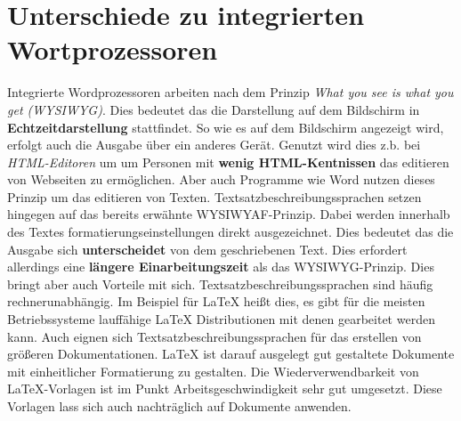 \section{Unterschiede zu integrierten Wortprozessoren}
Integrierte Wordprozessoren arbeiten nach dem Prinzip \textit{What you see is what you get (WYSIWYG)}. Dies bedeutet das die Darstellung auf dem Bildschirm in \textbf{Echtzeitdarstellung} stattfindet. So wie es auf dem Bildschirm angezeigt wird, erfolgt auch die Ausgabe über ein anderes Gerät. Genutzt wird dies z.b. bei \textit{HTML-Editoren} um um Personen mit \textbf{wenig HTML-Kentnissen} das editieren von Webseiten zu ermöglichen. Aber auch Programme wie Word nutzen dieses Prinzip um das editieren von Texten.
Textsatzbeschreibungssprachen setzen hingegen auf das bereits erwähnte WYSIWYAF-Prinzip. Dabei werden innerhalb des Textes formatierungseinstellungen direkt ausgezeichnet. Dies bedeutet das die Ausgabe sich \textbf{unterscheidet} von dem geschriebenen Text. Dies erfordert allerdings eine \textbf{längere Einarbeitungszeit} als das WYSIWYG-Prinzip.
Dies bringt aber auch Vorteile mit sich. Textsatzbeschreibungssprachen sind häufig rechnerunabhängig. Im Beispiel für LaTeX heißt dies, es gibt für die meisten Betriebssysteme lauffähige LaTeX Distributionen mit denen gearbeitet werden kann. Auch eignen sich Textsatzbeschreibungssprachen für das erstellen von größeren Dokumentationen. LaTeX ist darauf ausgelegt gut gestaltete Dokumente mit einheitlicher Formatierung zu gestalten. Die Wiederverwendbarkeit von LaTeX-Vorlagen ist im Punkt Arbeitsgeschwindigkeit sehr gut umgesetzt. Diese Vorlagen lass sich auch nachträglich auf Dokumente anwenden.\nocite{schweitze:2013} \nocite{hommel:2010}
